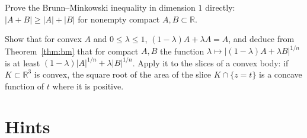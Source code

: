 \begin{exercise}[$\star$]\label{ex:bmone}
Prove the Brunn--Minkowski inequality in dimension $1$ directly: $|A+B|\ge|A|+|B|$ for nonempty compact $A,B\subset\mathbb R$.
\end{exercise}

\begin{exercise}[$\star\star$]\label{ex:bmconcave}
Show that for convex $A$ and $0\le\lambda\le1$, $(1-\lambda)A+\lambda A=A$, and deduce from Theorem~\ref{thm:bm} that for compact $A,B$ the function
$\lambda\mapsto|(1-\lambda)A+\lambda B|^{1/n}$ is at least $(1-\lambda)|A|^{1/n}+\lambda|B|^{1/n}$. Apply it to the slices of a convex body: if $K\subset\mathbb R^3$ is convex,
the square root of the area of the slice $K\cap\{z=t\}$ is a concave function of $t$ where it is positive.
\end{exercise}

\section{Hints}

